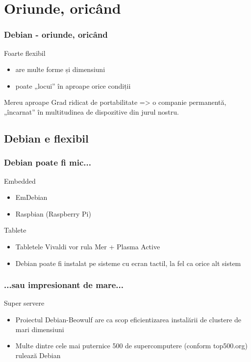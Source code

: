 \documentclass[xcolor=dvipsnames]{beamer}
\begin{document}
\section{Oriunde, oricând}
\begin{frame}
\frametitle{Debian - oriunde, oricând}
\begin{block}
{Foarte flexibil}
\begin{itemize}
\item are multe forme și dimensiuni
\item poate „locui” în aproape orice condiții
\end{itemize}
\end{block}
\begin{block}
{Mereu aproape}
Grad ridicat de portabilitate => o companie permanentă, „încarnat” în multitudinea de dispozitive din jurul nostru.
\end{block}
\end{frame}

\subsection{Debian e flexibil}
\begin{frame}
\frametitle{Debian poate fi mic...}
\begin{block}
{Embedded}
\begin{itemize}
\item EmDebian
\item Raspbian (Raspberry Pi)
\end{itemize}
\end{block}
\begin{block}
{Tablete}
\begin{itemize}
\item Tabletele Vivaldi vor rula Mer + Plasma Active
\item Debian poate fi instalat pe sisteme cu ecran tactil, la fel ca orice alt sistem
\end{itemize}
\end{block}
\end{frame}

\begin{frame}
\frametitle{...sau impresionant de mare...}
\begin{block}
{Super servere}
\begin{itemize}
\item Proiectul Debian-Beowulf are ca scop eficientizarea instalării de clustere de mari dimensiuni
\item Multe dintre cele mai puternice 500 de supercomputere (conform top500.org) rulează Debian
\end{itemize}
\end{block}
\end{frame}
\end{document}
